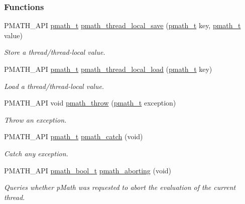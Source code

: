 \subsubsection*{Functions}
\begin{CompactItemize}
\item 
PMATH\_\-API \hyperlink{classpmath__t}{pmath\_\-t} \hyperlink{group__threads_ga545e19cccf64ee4848a5506fa20cf21}{pmath\_\-thread\_\-local\_\-save} (\hyperlink{classpmath__t}{pmath\_\-t} key, \hyperlink{classpmath__t}{pmath\_\-t} value)
\begin{CompactList}\small\item\em Store a thread/thread-local value. \item\end{CompactList}\item 
PMATH\_\-API \hyperlink{classpmath__t}{pmath\_\-t} \hyperlink{group__threads_g64fe008ee1e3a4841eb98ca13e212537}{pmath\_\-thread\_\-local\_\-load} (\hyperlink{classpmath__t}{pmath\_\-t} key)
\begin{CompactList}\small\item\em Load a thread/thread-local value. \item\end{CompactList}\item 
PMATH\_\-API void \hyperlink{group__threads_gf1aa6d6603faaa4120207be6108e356c}{pmath\_\-throw} (\hyperlink{classpmath__t}{pmath\_\-t} exception)
\begin{CompactList}\small\item\em Throw an exception. \item\end{CompactList}\item 
PMATH\_\-API \hyperlink{classpmath__t}{pmath\_\-t} \hyperlink{group__threads_gf791e0088342297d6511a4481421f446}{pmath\_\-catch} (void)
\begin{CompactList}\small\item\em Catch any exception. \item\end{CompactList}\item 
PMATH\_\-API \hyperlink{group__general__types_gc92090cb0b56345d6c379ed2341d4ef4}{pmath\_\-bool\_\-t} \hyperlink{group__threads_gb75a9c87401fddb42b297ddb0495415f}{pmath\_\-aborting} (void)
\begin{CompactList}\small\item\em Queries whether pMath was requested to abort the evaluation of the current thread. \item\end{CompactList}\item 

\end{CompactItemize}
